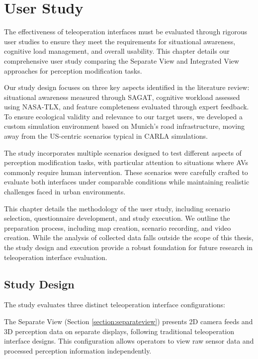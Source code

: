 
\chapter{User Study}\label{chapter:userstudy}
The effectiveness of teleoperation interfaces must be evaluated through rigorous user studies to ensure they meet the requirements for situational awareness, cognitive load management, and overall usability. This chapter details our comprehensive user study comparing the Separate View and Integrated View approaches for perception modification tasks.

Our study design focuses on three key aspects identified in the literature review: situational awareness measured through SAGAT, cognitive workload assessed using NASA-TLX, and feature completeness evaluated through expert feedback. To ensure ecological validity and relevance to our target users, we developed a custom simulation environment based on Munich's road infrastructure, moving away from the US-centric scenarios typical in CARLA simulations.

The study incorporates multiple scenarios designed to test different aspects of perception modification tasks, with particular attention to situations where \acp{AV} commonly require human intervention. These scenarios were carefully crafted to evaluate both interfaces under comparable conditions while maintaining realistic challenges faced in urban environments.

This chapter details the methodology of the user study, including scenario selection, questionnaire development, and study execution. We outline the preparation process, including map creation, scenario recording, and video creation. While the analysis of collected data falls outside the scope of this thesis, the study design and execution provide a robust foundation for future research in teleoperation interface evaluation.
\section{Study Design}

The study evaluates three distinct teleoperation interface configurations:

The Separate View (Section \ref{section:separateview}) presents 2D camera feeds and 3D perception data on separate displays, following traditional teleoperation interface designs. This configuration allows operators to view raw sensor data and processed perception information independently.

